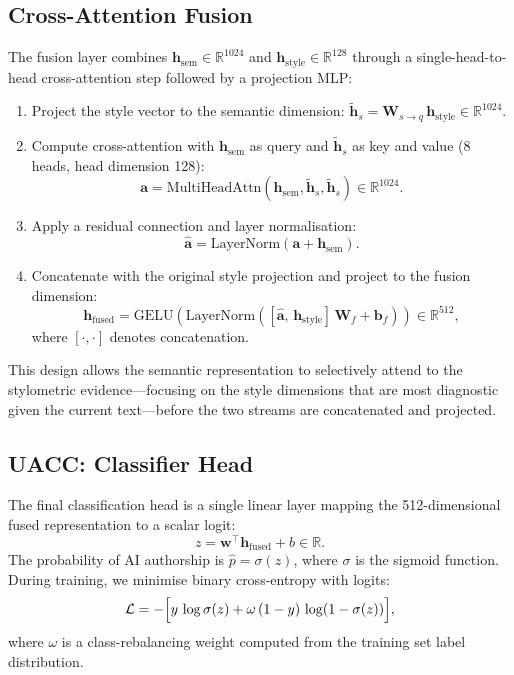 \subsection{Cross-Attention Fusion}

The fusion layer combines $\mathbf{h}_{\text{sem}} \in \mathbb{R}^{1024}$ and $\mathbf{h}_{\text{style}} \in \mathbb{R}^{128}$ through a single-head-to-head cross-attention step followed by a projection MLP:

\begin{enumerate}
  \item Project the style vector to the semantic dimension: $\tilde{\mathbf{h}}_s = \mathbf{W}_{s\to q}\, \mathbf{h}_{\text{style}} \in \mathbb{R}^{1024}$.
  \item Compute cross-attention with $\mathbf{h}_{\text{sem}}$ as query and $\tilde{\mathbf{h}}_s$ as key and value (8 heads, head dimension 128):
    \begin{equation}
      \mathbf{a} = \text{MultiHeadAttn}(\mathbf{h}_{\text{sem}}, \tilde{\mathbf{h}}_s, \tilde{\mathbf{h}}_s) \in \mathbb{R}^{1024}.
    \end{equation}
  \item Apply a residual connection and layer normalisation:
    \begin{equation}
      \hat{\mathbf{a}} = \text{LayerNorm}(\mathbf{a} + \mathbf{h}_{\text{sem}}).
    \end{equation}
  \item Concatenate with the original style projection and project to the fusion dimension:
    \begin{equation}
      \mathbf{h}_{\text{fused}} = \text{GELU}(\text{LayerNorm}([\hat{\mathbf{a}},\, \mathbf{h}_{\text{style}}]\,\mathbf{W}_f + \mathbf{b}_f)) \in \mathbb{R}^{512},
    \end{equation}
    where $[\cdot,\cdot]$ denotes concatenation.
\end{enumerate}

This design allows the semantic representation to selectively attend to the stylometric evidence—focusing on the style dimensions that are most diagnostic given the current text—before the two streams are concatenated and projected.

\subsection{UACC: Classifier Head}

The final classification head is a single linear layer mapping the 512-dimensional fused representation to a scalar logit:
\begin{equation}
  z = \mathbf{w}^\top \mathbf{h}_{\text{fused}} + b \in \mathbb{R}.
\end{equation}
The probability of AI authorship is $\hat{p} = \sigma(z)$, where $\sigma$ is the sigmoid function. During training, we minimise binary cross-entropy with logits:
\begin{equation}
  \mathcal{L} = -\Bigl[y\,\log\sigma(z) + \omega\,(1-y)\,\log(1-\sigma(z))\Bigr],
\end{equation}
where $\omega$ is a class-rebalancing weight computed from the training set label distribution.

